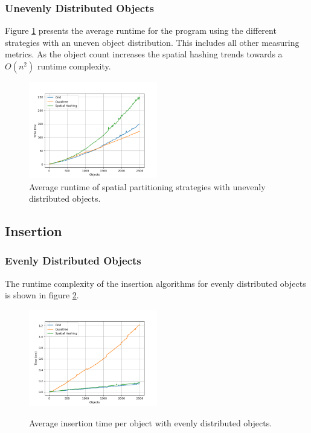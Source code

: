 \documentclass[a4paper, 12pt]{article}
\begin{document}
\subsubsection{Unevenly Distributed Objects}
Figure \ref{fig:uneven-average} presents the average runtime for the program
using the different strategies with an uneven object distribution. This includes
all other measuring metrics. As the object count increases the spatial hashing
trends towards a $O(n^2)$ runtime complexity.
\begin{figure}[h]
    \centering
    \includegraphics[width=0.5\textwidth]{uneven-average.png}
    \caption{Average runtime of spatial partitioning strategies with unevenly
    distributed objects.}
    \label{fig:uneven-average}
\end{figure}

\subsection{Insertion}

\subsubsection{Evenly Distributed Objects}
The runtime complexity of the insertion algorithms for evenly distributed
objects is shown in figure \ref{fig:even-insert}.
\begin{figure}[h]
    \centering
    \caption{Average insertion time per object with evenly distributed objects.}
    \includegraphics[width=0.5\textwidth]{even-insert.png}
    \label{fig:even-insert}
\end{figure}
\end{document}
